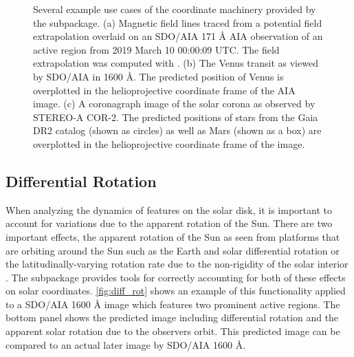 \begin{figure}
    \caption{Several example use cases of the coordinate machinery provided by the  subpackage.
    (a) Magnetic field lines traced from a potential field extrapolation overlaid on an SDO/AIA 171 \AA{} AIA observation of an active region from 2019 March 10 00:00:09 UTC.
    The field extrapolation was computed with  \citep{david_stansby_2019_3237053}.
    (b) The Venus transit as viewed by SDO/AIA in 1600 \AA. The predicted position of Venus is overplotted in the helioprojective coordinate frame of the AIA image.
    (c) A coronagraph image of the solar corona as observed by STEREO-A COR-2. The predicted positions of stars from the Gaia DR2 catalog (shown as circles) as well as Mars (shown as a box) are overplotted in the helioprojective coordinate frame of the image.}
    \label{fig:coordinates_examples}
\end{figure}

\subsection{Differential Rotation}
\label{sec:differential_rotation}


When analyzing the dynamics of features on the solar disk, it is important to account for variations due to the apparent rotation of the Sun.
There are two important effects, the apparent rotation of the Sun as seen from platforms that are orbiting around the Sun such as the Earth and solar differential rotation or the latitudinally-varying rotation rate due to the non-rigidity of the solar interior \citep[see][]{Beck2000}.
The  subpackage provides tools for correctly accounting for both of these effects on solar coordinates. 
\autoref{fig:diff_rot} shows an example of this functionality applied to a SDO/AIA 1600 \AA{} image which features two prominent active regions. The bottom panel shows the predicted image including differential rotation and the apparent solar rotation due to the observers orbit. This predicted image can be compared to an actual later image by SDO/AIA 1600 \AA{}.

